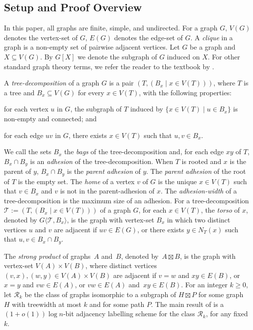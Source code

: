 \documentclass{patmorin}
\renewcommand{\geq}{\geqslant}
\newcommand{\defin}[1]{\emph{\textcolor{brightmaroon}{#1}}}
\newcommand{\torso}[2]{{#1}\langle{#2}\rangle}
\newcommand{\calR}{\mathcal{R}}
\newcommand{\calT}{\mathcal{T}}
\begin{document}
\subsection{Setup and Proof Overview}
\label{KeyTools}

In this paper, all graphs are finite, simple, and undirected.  For a graph $G$, \defin{$V(G)$} denotes the vertex-set of $G$, \defin{$E(G)$} denotes the edge-set of $G$.  A \defin{clique} in a graph is a non-empty set of pairwise adjacent vertices.   Let $G$ be a graph and $X\subseteq V(G)$. By $G[X]$ we denote the subgraph of $G$ induced on $X$. For other standard graph theory terms, we refer the reader to the textbook by \citet{diestel:graph}.

A \defin{tree-decomposition} of a graph $G$ is a pair $(T,(B_x \mid x \in V(T)))$, where $T$ is a tree and $B_x \subseteq V(G)$ for every $x \in V(T)$, with the following properties:
\begin{enumerate*}[label=(\alph*)]
  \item for each vertex $u$ in $G$, the subgraph of $T$ induced by $\{x \in V(T) \mid u \in B_x\}$ is non-empty and connected; and
  \item for each edge $uv$ in $G$, there exists $x\in V(T)$ such that $u,v\in B_x$.
\end{enumerate*}
We call the sets $B_x$ the \defin{bags} of the tree-decomposition and, for each edge $xy$ of $T$, $B_x\cap B_y$ is an \defin{adhesion} of the tree-decomposition.  When $T$ is rooted and $x$ is the parent of $y$, $B_x\cap B_y$ is the \defin{parent adhesion} of $y$. The \defin{parent adhesion} of the root of $T$ is the empty set. The \defin{home} of a vertex $v$ of $G$ is the unique $x\in V(T)$ such that $v\in B_x$ and $v$ is not in the parent-adhesion of $x$. The \defin{adhesion-width} of a tree-decomposition is the maximum size of an adhesion. For a tree-decomposition $\calT:=(T,(B_x \mid x\in V(T)))$ of a graph $G$, for each  $x\in V(T)$, the \defin{torso} of $x$, denoted by \defin{$\torso{G}{\calT,B_x}$}, is the graph with vertex-set $B_x$ in which two distinct vertices $u$ and $v$ are adjacent if $uv \in E(G)$, or there exists $y \in N_T(x)$  such that $u,v \in B_x \cap B_y$.

The \defin{strong product} of graphs~$A$ and~$B$, denoted by~${A \boxtimes B}$, is the graph with vertex-set ${V(A) \times V(B)}$, where distinct vertices ${(v,x),(w,y) \in V(A) \times V(B)}$ are adjacent if
${v=w}$ and ${xy \in E(B)}$, or
${x=y}$ and ${vw \in E(A)}$, or
${vw \in E(A)}$ and~${xy \in E(B)}$.
For an integer $k\geq 0$, let \defin{$\calR_{k}$} be the class of graphs isomorphic to a subgraph of $H\boxtimes P$ for some graph $H$ with treewidth at most $k$ and for some path $P$.  The main result of \citet{dujmovic.esperet.ea:adjacency} is a $(1+o(1))\log n$-bit adjacency labelling scheme for the class $\calR_k$, for any fixed $k$.
\end{document}
